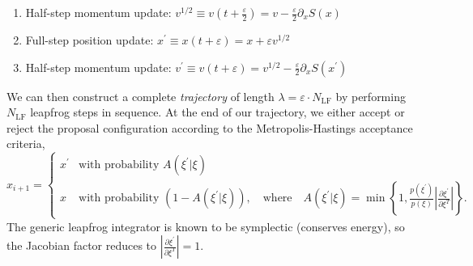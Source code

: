 \documentclass{article} %
\begin{document}
\begin{enumerate}
   \item Half-step momentum update: \hspace{12pt}\(%
      v^{1/2} \equiv v{\left(t+\frac{\varepsilon}{2}\right)} = v-\frac{\varepsilon}{2}\partial_{x}S(x)
   \)
   \item Full-step position update: \hspace{36pt}\(%
      x^{\prime} \equiv x(t+\varepsilon) = x + \varepsilon v^{1/2}
   \)
   \item Half-step momentum update:
      \hspace{18pt} \(%
         v^{\prime} \equiv v(t+\varepsilon) = v^{1/2} - \frac{\varepsilon}{2}\partial_{x} S(x^{\prime})
   \)
\end{enumerate}
%
We can then construct a complete \emph{trajectory} of length \(\lambda = \varepsilon\cdot N_{\mathrm{LF}}\) by
performing \(N_{\mathrm{LF}}\) leapfrog steps in sequence.
%
At the end of our trajectory, we either accept or reject the proposal configuration according to the Metropolis-Hastings
acceptance criteria,
%
\begin{equation}
   x_{i+1} =
   \begin{cases}%
      x^{\prime} &\mbox{with probability } A(\xi^{\prime}|\xi) \\
      x &\mbox{with probability } (1 - A(\xi^{\prime}|\xi)), \quad\text{where}\quad %
         A(\xi^{\prime}|\xi) = \min\left\{%
            1, \frac{p(\xi^{\prime})}{p(\xi)}\left|\frac{\partial{\xi^{\prime}}}{\partial\xi^{T}}\right|%
         \right\}.
   \end{cases}
   \label{eq:mhcriteria}
\end{equation}
%
%
The generic leapfrog integrator is known to be symplectic (conserves energy), so the Jacobian factor reduces to
\(\left|\frac{\partial\xi^{\prime}}{\partial\xi^{T}}\right| = 1\). 
%
%
\end{document}
